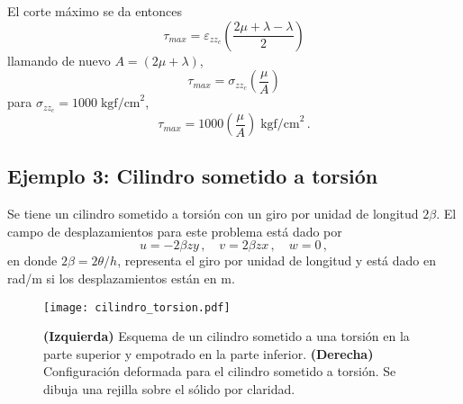 \documentclass[../notas medios.tex]{subfiles}
\begin{document}
\begin{itemize}
El corte máximo se da entonces
\[\tau_{max} = \varepsilon _{zz_c}  \left(\dfrac{2\mu + \lambda - \lambda}{2}\right)\]
llamando de nuevo $A = (2 \mu + \lambda)$,
\[\tau_{max} = \sigma_{zz_c} \left(\dfrac{\mu}{A}\right)\]
para  $\sigma_{zz_c} = 1000 \; \text{kgf/cm}^2$,
\[\tau_{max} = 1000 \left(\dfrac{\mu}{A}\right) \; \text{kgf/cm}^2\, .\]

\end{itemize}

\subsection*{Ejemplo 3: Cilindro sometido a torsión}

Se tiene un cilindro sometido a torsión con un giro por unidad de longitud $2\beta$. El campo de desplazamientos para este problema está dado por
\[
  u = -2\beta zy\, ,\quad
  v = 2\beta zx\, , \quad
  w = 0\, ,
\]
en donde $2\beta = 2\theta/h$, representa el giro por unidad de longitud y está dado en rad/m si los desplazamientos están en m.
\begin{figure}[H]
 \centering
 \texttt{[image: cilindro\_torsion.pdf]} 
 \caption{\textbf{(Izquierda)} Esquema de un cilindro sometido a una torsión en la parte superior y empotrado en la parte inferior. \textbf{(Derecha)} Configuración deformada para el cilindro sometido a torsión. Se dibuja una rejilla sobre el sólido por claridad.}
 \label{fig:cilindro_torsion}
\end{figure}
\end{document}
